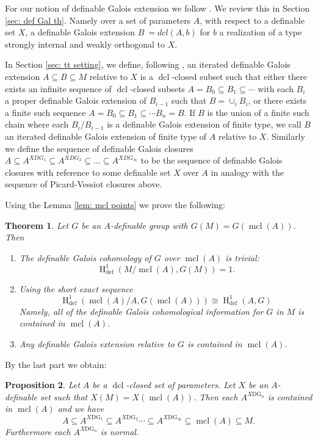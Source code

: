 \documentclass{amsart}
\newtheorem{theorem}{Theorem}[section]
\newtheorem{proposition}[theorem]{Proposition}
\theoremstyle{definition}
\theoremstyle{remark}
\numberwithin{equation}{section}
\def \defin {\operatorname{def}}
\def \HH {\operatorname{H}}
\def \mcl {\operatorname{mcl}}
\def \dcl {\operatorname{dcl}}
\begin{document}
For our notion of definable Galois extension we follow \cite{OmarAnand}. We review this in Section \ref{sec: def Gal th}. Namely over a set of parameters $A$, with respect to a definable set $X$, a definable Galois extension $B\ = dcl(A,b)$ for $b$ a realization of a type strongly internal and weakly orthogonal to $X$. 

In Section \ref{sec: tt setting}, we define, following \cite{meretzky2026galoistheoryautomorphismgroups}, an iterated definable Galois extension $A \subseteq B \subseteq M$ relative to $X$ is a $\dcl$-closed subset such that either there exists an infinite sequence of $\dcl$-closed subsets $A=B_0 \subseteq B_1 \subseteq \cdots $ with each $B_i$ a proper definable Galois extension of $B_{i-1}$ such that $B= \cup_iB_i$, or there exists a finite such sequence $A=B_0 \subseteq B_1 \subseteq \cdots B_n=B$. If $B$ is the union of a finite such chain where each $B_i/B_{i-1}$ is a definable Galois extension of finite type, we call $B$ an iterated definable Galois extension of finite type of $A$ relative to $X$. Similarly we define the sequence of definable Galois closures $A \subseteq A^{XDG_1} \subseteq A^{XDG_2} \subseteq ... \subseteq A^{XDG_\infty}$ to be the sequence of definable Galois closures with reference to some definable set $X$ over $A$ in analogy with the sequence of Picard-Vessiot closures above. 

Using the Lemma \ref{lem: mcl points} we prove the following: 

\begin{theorem}\relax
    Let $G$ be an $A$-definable group with $G(M) = G(\mcl(A))$. Then
    \begin{enumerate}
        \item The definable Galois cohomology of $G$ over $\mcl(A)$ is trivial: $$\HH^1_{\defin}(M/\mcl(A),G(M)) = 1.$$
        \item Using the short exact sequence $$\HH^1_{\defin}(\mcl(A)/A,G(\mcl(A))) \cong \HH^1_{\defin}(A,G)$$ Namely, all of the definable Galois cohomological information for $G$ in $M$ is contained in $\mcl(A)$.
        \item Any definable Galois extension relative to $G$ is contained in $\mcl(A)$.
    \end{enumerate}
\end{theorem}

By the last part we obtain:

\begin{proposition}
    Let $A$ be a $\dcl$-closed set of parameters. Let $X$ be an $A$-definable set such that $X(M) = X(\mcl(A))$. Then each $A^{X\text{DG}_n}$ is contained in $\mcl(A)$ and we have $$A \subseteq A^{X\text{DG}_1} \subseteq A^{X\text{DG}_2} \cdots \subseteq A^{X\text{DG}_\infty} \subseteq \mcl(A) \subseteq M.$$ Furthermore each $A^{X\text{DG}_n}$ is normal.
\end{proposition}
\end{document}

